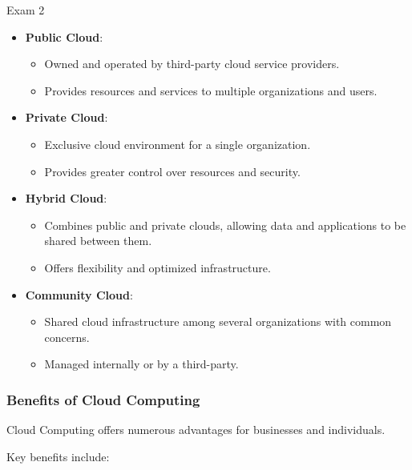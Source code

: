 \begin{examnotes}{Exam 2}
\begin{highlight}
        \begin{itemize}
            \item \textbf{Public Cloud}:
                \begin{itemize}
                    \item Owned and operated by third-party cloud service providers.
                    \item Provides resources and services to multiple organizations and users.
                \end{itemize}
            \item \textbf{Private Cloud}:
                \begin{itemize}
                    \item Exclusive cloud environment for a single organization.
                    \item Provides greater control over resources and security.
                \end{itemize}
            \item \textbf{Hybrid Cloud}:
                \begin{itemize}
                    \item Combines public and private clouds, allowing data and applications to be shared between them.
                    \item Offers flexibility and optimized infrastructure.
                \end{itemize}
            \item \textbf{Community Cloud}:
                \begin{itemize}
                    \item Shared cloud infrastructure among several organizations with common concerns.
                    \item Managed internally or by a third-party.
                \end{itemize}
        \end{itemize}
    \end{highlight}
    
    \subsubsection*{Benefits of Cloud Computing}
    
    Cloud Computing offers numerous advantages for businesses and individuals.
    
    \begin{highlight}
        Key benefits include:
        

\end{highlight}
\end{examnotes}

